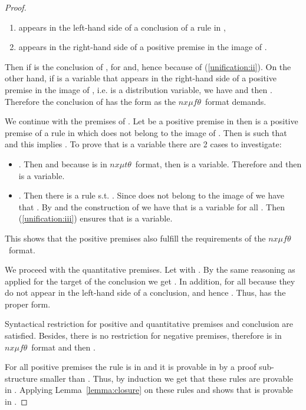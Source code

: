 \documentclass[submission,copyright,creativecommons]{eptcs}
\newcommand{\nxmuft}{\ensuremath{\textit{nx}\mu\textit{f}\theta}}
\newcommand{\nxmutt}{\ensuremath{\textit{nx}\mu\textit{t}\theta}}
\begin{document}
\begin{proof}
\begin{enumerate}
 \item  appears in the left-hand side of a conclusion of a rule in ,
 \item  appears in the right-hand side of a positive premise in the image of . 
\end{enumerate}

 Then if  is the conclusion of , 
  for  and, 
 hence  because of (\ref{unification:ii}).
On the other hand, if  is a variable that appears in the right-hand 
 side of a positive premise in the image of , i.e.  is a distribution variable, 
 we have  and then 
 . 
 Therefore the conclusion  of  
 has the form  as the \nxmuft\ format demands. 


 We continue with the premises of .   
 Let  be a positive premise in  
 then  is a positive premise of a rule in  which does not belong
 to the image of . Then
  is such that  and this implies .
To prove that  is a variable there are 2 cases to investigate:

\begin{itemize}
 \item . 
Then  and because  is in  \nxmutt\ format, 
 then  is a variable.
 Therefore  and then  is a variable.
\item .
Then there is a rule  s.t. .
  Since   does not belong to the image of  we have that 
  . By  and the construction of 
  we have that  is a variable for all . 
  Then (\ref{unification:iii}) ensures that  is a variable.  
\end{itemize}

This shows that the positive premises also fulfill the requirements of the \nxmuft\ format.

We proceed with the quantitative premises. 
Let  with .
By the same reasoning as applied for the target of the conclusion we get . 
In addition,  for all  because they do not appear in the left-hand side of a conclusion, and hence .
Thus,  has the proper form.

Syntactical restriction for positive and quantitative premises  and conclusion are satisfied.
Besides, there is no restriction for negative premises, therefore  is in \nxmuft\ format 
and then .


 For all positive premises  the rule 
 is in  and it is provable in  by a proof sub-structure smaller 
 than . Thus, by induction we get that these rules are provable in .
 Applying Lemma~\ref{lemma:closure} on these rules and  shows that  is provable in .
\end{proof}
\end{document}
